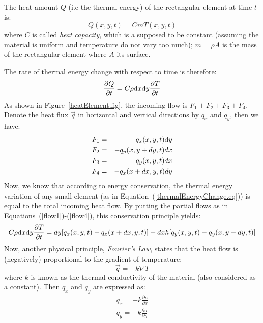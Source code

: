 \documentclass[11pt]{article}
\begin{document}
\noindent The heat amount $Q$ (i.e the thermal energy) of the rectangular element at time $t$ is: 
\begin{equation}
Q(x,y,t)=C m T(x,y,t)
\end{equation}
where $C$ is called \emph{heat capacity}, which is a supposed to be constant (assuming the material is uniform and temperature do not vary too much); $m = \rho A$ is the mass of the rectangular element where $A$ its surface.

The rate of thermal energy change with respect to time is therefore:
\begin{equation}\label{thermalEnergyChange.eq}
\frac{\partial Q}{\partial t} = C\rho \mathrm d x \mathrm d y\frac{\partial T}{\partial t}
\end{equation}
As shown in Figure~\ref{heatElement.fig}, the incoming flow is $F_1 + F_2 + F_3 + F_4$. Denote the heat flux $\vec q$ in horizontal and vertical directions by $q_x$ and $q_y$, then we have:
\begin{eqnarray} %
F_1 &=& q_x(x,y,t)\ud y\label{flow1}\\
F_2 &=& -q_y(x,y+dy,t)dx\label{flow2}\\
F_3 &=& q_y(x,y,t)dx\label{flow3}\\
F_4 &=& -q_x(x+dx,y,t)dy\label{flow4}
\end{eqnarray}
Now, we know that according to energy conservation, the thermal energy variation of any small element (as in Equation~(\ref{thermalEnergyChange.eq})) is equal to the total incoming heat flow.  By putting the partial flows as in Equations~(\ref{flow1})-(\ref{flow4}), this conservation principle yields:
\begin{equation}\label{thermalEnergyChange.eq2}
C\rho \mathrm d x \mathrm d y\frac{\partial T}{\partial t} = dy [q_x(x,y,t)-q_x(x+dx,y,t)]+dxh[q_y(x,y,t)-q_y(x,y+dy,t)]
\end{equation}
Now, another physical principle, \emph{Fourier's Law}, states that the heat flow is (negatively) proportional to the gradient of temperature:
\begin{equation}\label{FourierLaw.eq}
\vec q = -k\nabla T
\end{equation}
where $k$ is known as the thermal conductivity of the material (also considered as a constant). Then $q_x$ and $q_y$ are expressed as:
\begin{equation}
\begin{split}
q_x=-k\frac{\partial u}{\partial x}\\
q_y=-k\frac{\partial u}{\partial y}
\end{split}
\end{equation}
\end{document}
